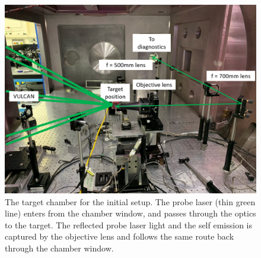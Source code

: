\begin{figure} [!h]
\begin{centering}
\includegraphics[width=1.0\textwidth]{figures/AppendixExperiment/InitialChamber.png}%
\caption{\label{fig:Appx-InitialChamber} The target chamber for the initial setup. The probe laser (thin green line) enters from the chamber window, and passes through the optics to the target. The reflected probe laser light and the self emission is captured by the objective lens and follows the same route back through the chamber window.}
\end{centering}
\end{figure}

